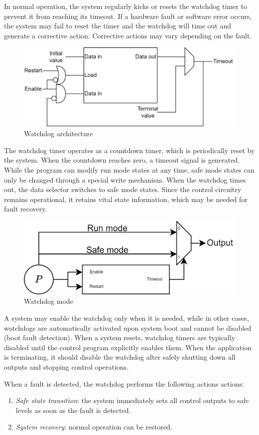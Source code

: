 In normal operation, the system regularly kicks or resets the watchdog timer to prevent it from reaching its timeout. 
If a hardware fault or software error occurs, the system may fail to reset the timer and the watchdog will time out and generate a corrective action.
Corrective actions may vary depending on the fault.
\begin{figure}[H]
    \centering
    \includegraphics[width=0.75\linewidth]{images/wdog.png}
    \caption{Watchdog architecture}
\end{figure}
The watchdog timer operates as a countdown timer, which is periodically reset by the system. 
When the countdown reaches zero, a timeout signal is generated. 
While the program can modify run mode states at any time, safe mode states can only be changed through a special write mechanism. 
When the watchdog times out, the data selector switches to safe mode states.
Since the control circuitry remains operational, it retains vital state information, which may be needed for fault recovery.
\begin{figure}[H]
    \centering
    \includegraphics[width=0.75\linewidth]{images/wdog1.png}
    \caption{Watchdog mode}
\end{figure}

A system may enable the watchdog only when it is needed, while in other cases, watchdogs are automatically activated upon system boot and cannot be disabled (boot fault detection). 
When a system resets, watchdog timers are typically disabled until the control program explicitly enables them.
When the application is terminating, it should disable the watchdog after safely shutting down all outputs and stopping control operations.

When a fault is detected, the watchdog performs the following actions actions:
\begin{enumerate}
    \item \textit{Safe state transition}: the system immediately sets all control outputs to safe levels as soon as the fault is detected. 
    \item \textit{System recovery}: normal operation can be restored. 
\end{enumerate}

